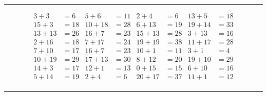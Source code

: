 \documentclass{article}
\begin{document}
\begin{sloppy}
\hrule
\begin{align*}
    {3} + {3} &= {6} & {5} + {6} &= {11} & {2} + {4} &= {6} & {13} + {5} &= {18} \\
    {15} + {3} &= {18} & {10} + {18} &= {28} & {6} + {13} &= {19} & {19} + {14} &= {33} \\
    {13} + {13} &= {26} & {16} + {7} &= {23} & {15} + {13} &= {28} & {3} + {13} &= {16} \\
    {2} + {16} &= {18} & {7} + {17} &= {24} & {19} + {19} &= {38} & {11} + {17} &= {28} \\
    {7} + {10} &= {17} & {16} + {7} &= {23} & {10} + {1} &= {11} & {3} + {1} &= {4} \\
    {10} + {19} &= {29} & {17} + {13} &= {30} & {8} + {12} &= {20} & {19} + {10} &= {29} \\
    {14} + {3} &= {17} & {12} + {1} &= {13} & {0} + {15} &= {15} & {6} + {10} &= {16} \\
    {5} + {14} &= {19} & {2} + {4} &= {6} & {20} + {17} &= {37} & {11} + {1} &= {12} \\
\end{align*}
\hrule
\end{sloppy}
\end{document}
